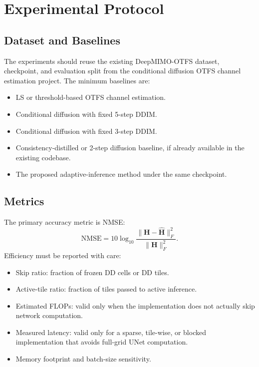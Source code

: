\documentclass[10pt,journal]{IEEEtran}
\newcommand{\mat}[1]{\mathbf{#1}}
\begin{document}
\section{Experimental Protocol}

\subsection{Dataset and Baselines}

The experiments should reuse the existing DeepMIMO-OTFS dataset, checkpoint,
and evaluation split from the conditional diffusion OTFS channel estimation
project. The minimum baselines are:
\begin{itemize}
  \item LS or threshold-based OTFS channel estimation.
  \item Conditional diffusion with fixed 5-step DDIM.
  \item Conditional diffusion with fixed 3-step DDIM.
  \item Consistency-distilled or 2-step diffusion baseline, if already
  available in the existing codebase.
  \item The proposed adaptive-inference method under the same checkpoint.
\end{itemize}

\subsection{Metrics}

The primary accuracy metric is NMSE:
\begin{equation}
  \mathrm{NMSE}
  =
  10\log_{10}
  \frac{\|\mat{H}-\hat{\mat{H}}\|_F^2}{\|\mat{H}\|_F^2}.
  \label{eq:nmse}
\end{equation}
Efficiency must be reported with care:
\begin{itemize}
  \item Skip ratio: fraction of frozen DD cells or DD tiles.
  \item Active-tile ratio: fraction of tiles passed to active inference.
  \item Estimated FLOPs: valid only when the implementation does not actually
  skip network computation.
  \item Measured latency: valid only for a sparse, tile-wise, or blocked
  implementation that avoids full-grid UNet computation.
  \item Memory footprint and batch-size sensitivity.
\end{itemize}
\end{document}
